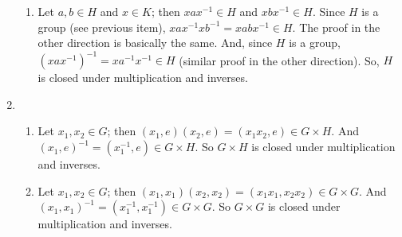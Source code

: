 \documentclass{article}
\begin{document}
\begin{enumerate}
\begin{enumerate}[label=(\alph*)]
            \item Let $a, b \in H$ and $x \in K$; then $xax^{-1} \in H$ and $xbx^{-1} \in H$. Since $H$ is a group (see previous item), $xax^{-1}xb^{-1} = xabx^{-1} \in H$. The proof in the other direction is basically the same. And, since $H$ is a group, $(xax^{-1})^{-1} = xa^{-1}x^{-1} \in H$ (similar proof in the other direction). So, $H$ is closed under multiplication and inverses.
        \end{enumerate}
    
    \item \begin{enumerate}[label=(\alph*)]
        \item Let $x_1, x_2 \in G$; then $(x_1, e)(x_2, e) = (x_1x_2, e) \in G \times H$. And $(x_1, e)^{-1} = (x_1^{-1}, e) \in G \times H$. So $G \times H$ is closed under multiplication and inverses.

        \item Let $x_1, x_2 \in G$; then $(x_1, x_1)(x_2, x_2) = (x_1x_1, x_2x_2) \in G \times G$. And $(x_1, x_1)^{-1} = (x_1^{-1}, x_1^{-1}) \in G \times G$. So $G \times G$ is closed under multiplication and inverses.
    \end{enumerate}
\end{enumerate}
\end{document}
